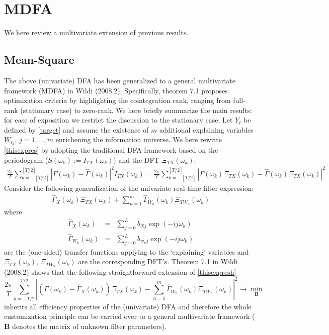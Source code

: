 \documentclass[11pt]{article}
\begin{document}
\section{MDFA}\label{imdfas}

We here review a multivariate extension of previous results.

\subsection{ Mean-Square}

The above (univariate) DFA has been generalized to a general multivariate framework (MDFA) in Wildi (2008.2). Specifically, theorem 7.1 proposes optimization criteria by highlighting the cointegration rank, ranging from full-rank (stationary case) to zero-rank. We here briefly summarize the main results: for ease of exposition we restrict the discussion to the stationary case. Let $Y_t$ be defined by \ref{target} and assume the existence of $m$ additional explaining variables $W_{tj}$, $j=1,...,m$ enrichening the information universe. We here rewrite \ref{thisexpres} by adopting the traditional DFA-framework based on the periodogram ($S(\omega_k):=I_{TX}(\omega_k)$) and the DFT $\Xi_{TX}(\omega_k)$:
\begin{eqnarray}\label{thisexpresh}
\frac{2\pi}{T} \sum_{k=-[T/2]}^{[T/2]}
|\Gamma(\omega_k)-\hat{\Gamma}(\omega_k)|^2 I_{TX}(\omega_k)=\frac{2\pi}{T} \sum_{k=-[T/2]}^{[T/2]}
|\Gamma(\omega_k)\Xi_{TX}(\omega_k)-\hat{\Gamma}(\omega_k)\Xi_{TX}(\omega_k)|^2
\end{eqnarray}
Consider the following generalization of the univariate real-time filter expression:
\begin{eqnarray}
\hat{\Gamma}_X(\omega_k)\Xi_{T
X}(\omega_k)+\sum_{n=1}^m
\hat{\Gamma}_{W_n}(\omega_k)\Xi_{TW_n}(\omega_k)\label{statcase}
\end{eqnarray}
where
\begin{eqnarray}
\hat{\Gamma}_X(\omega_k)&=&\sum_{j=0}^Lb_{Xj} \exp(-ij\omega_k)\label{exp1}\\
\hat{\Gamma}_{W_n}(\omega_k)&=&\sum_{j=0}^Lb_{w_nj} \exp(-ij\omega_k)\label{exp2}
\end{eqnarray}
are the (one-sided) transfer functions applying to the `explaining' variables and $\Xi_{TX}(\omega_k)$, $\Xi_{TW_n}(\omega_k)$ are the corresponding DFT's. Theorem 7.1 in Wildi (2008.2) shows that the following straightforward extension of \ref{thisexpresh}
\begin{equation}\label{dfanv}
\frac{2\pi}{T} \sum_{k=-T/2}^{T/2}
\left|\left(\Gamma(\omega_k)-\hat{\Gamma}_X(\omega_k)\right)\Xi_{T
X}(\omega_k)-\sum_{n=1}^m
\hat{\Gamma}_{W_n}(\omega_k)\Xi_{TW_n}(\omega_k)\right|^2 \to \min_{\mathbf{B}}
\end{equation}
inherits all efficiency properties of the (univariate) DFA and therefore the whole customization principle can be carried over to a general multivariate framework ($\mathbf{B}$ denotes the matrix of unknown filter parameters).
\end{document}
